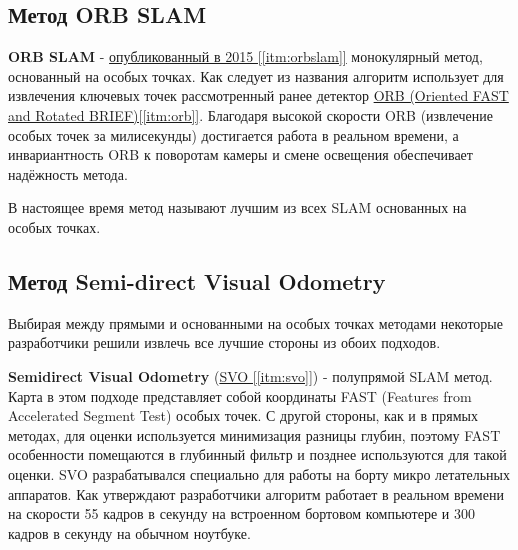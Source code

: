 \subsection{Метод ORB SLAM}
\textbf{ORB SLAM} - \hyperref[itm:orbslam]{опубликованный в 2015 [\ref{itm:orbslam}]} монокулярный метод, основанный на особых точках. Как следует из названия алгоритм использует для извлечения ключевых точек рассмотренный ранее детектор \hyperref[itm:orb]{ORB (Oriented FAST and Rotated BRIEF)[\ref{itm:orb}]}. Благодаря высокой скорости ORB (извлечение особых точек за милисекунды) достигается работа в реальном времени, а инвариантность ORB к поворотам камеры и смене освещения обеспечивает надёжность метода.

В настоящее время метод называют лучшим из всех SLAM основанных на особых точках.

\subsection{Метод Semi-direct Visual Odometry}
Выбирая между прямыми и основанными на особых точках методами некоторые разработчики решили извлечь все лучшие стороны из обоих подходов.

\textbf{Semidirect
Visual Odometry} (\hyperref[itm:svo]{SVO [\ref{itm:svo}]}) - полупрямой SLAM метод. Карта в этом подходе представляет собой координаты FAST (Features from Accelerated Segment Test) особых точек. С другой стороны, как и в прямых методах, для оценки используется минимизация разницы глубин, поэтому FAST особенности помещаются в глубинный фильтр и позднее используются для такой оценки.
SVO разрабатывался специально для работы на борту микро летательных аппаратов. Как утверждают разработчики алгоритм работает в реальном времени на скорости 55 кадров в секунду на встроенном бортовом компьютере и 300 кадров в секунду на обычном ноутбуке.